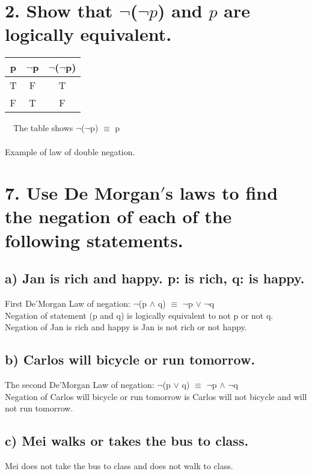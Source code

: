 \documentclass[11pt, oneside]{article} %
\numberwithin{equation}{section} %
\numberwithin{figure}{section} %
\numberwithin{table}{section} %
\begin{document}
\section{}
\begin{table}[!htp]
\section{2. Show that $\neg$($\neg$$p$) and $p$ are logically equivalent.}
\begin{tabular}{c c c}
\hline\hline
p & $\neg$p &  $\neg$($\neg$p) \\ [0.5ex] %
\hline
T & F & T\\
F & T & F \\ [1ex]
\hline
\end{tabular}
$\quad$The table shows $\neg$($\neg$p) $\equiv$ p \\
\\
Example of law of double negation.
\label{table:nonlin}
\end{table}

\section{7. Use De Morgan$'$s laws to find the negation of each of the following statements.}
\subsection{a) Jan is rich and happy. p: is rich, q: is happy.}
First De'Morgan Law of negation: $\neg$(p $\wedge$ q) $\equiv$ $\neg$p $\vee$ $\neg$q\\
Negation of statement (p and q) is logically equivalent to not p or not q. \\
Negation of Jan is rich and happy is Jan is not rich or not happy.

\subsection{b) Carlos will bicycle or run tomorrow.}
The second De'Morgan Law of negation: $\neg$(p $\vee$ q) $\equiv$ $\neg$p $\wedge$ $\neg$q \\
Negation of Carlos will bicycle or run tomorrow is Carlos will not bicycle and will not run tomorrow.

\subsection{c) Mei walks or takes the bus to class.}
Mei does not take the bus to class and does not walk to class.
\end{document}
